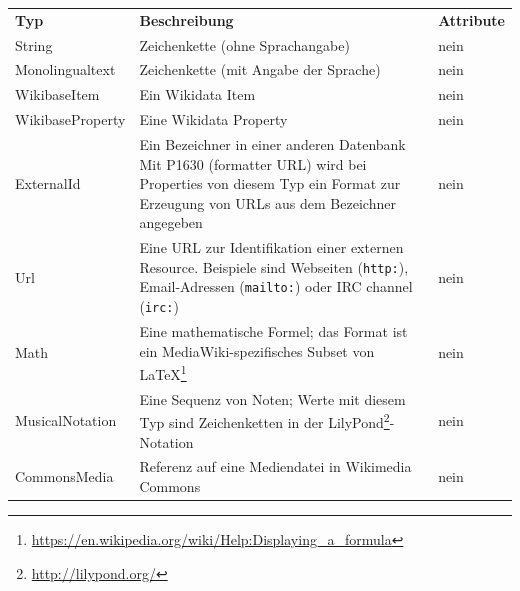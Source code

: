 \begin{table}
  \setlength{\extrarowheight}{0.1cm}
  \begin{adjustwidth}{-1cm}{-1cm}
    \begin{minipage}{\textwidth}
    \begin{tabular}{l p{} p{}}
      \bfseries{Typ}   & \bfseries{Beschreibung}                                                                                                                                       & \bfseries{Attribute} \\
      String           & Zeichenkette (ohne Sprachangabe)                                                                                                                              & nein \\
      Monolingualtext  & Zeichenkette (mit Angabe der Sprache)                                                                                                                         & nein \\
      WikibaseItem     & Ein Wikidata Item                                                                                                                                             & nein \\
      WikibaseProperty & Eine Wikidata Property                                                                                                                                        & nein \\
      ExternalId       & Ein Bezeichner in einer anderen Datenbank\newline{}
                         Mit P1630 (formatter URL) wird bei Properties von diesem Typ ein Format zur Erzeugung von URLs aus dem Bezeichner angegeben                                   & nein \\
      Url              & Eine URL zur Identifikation einer externen Resource. Beispiele sind Webseiten (\verb|http:|), Email-Adressen (\verb|mailto:|) oder IRC channel (\verb|irc:|)  & nein \\
      Math             & Eine mathematische Formel; das Format ist ein MediaWiki-spezifisches Subset von \LaTeX\footnote{\url{https://en.wikipedia.org/wiki/Help:Displaying_a_formula}}& nein \\
      MusicalNotation  & Eine Sequenz von Noten; Werte mit diesem Typ sind Zeichenketten in der LilyPond\footnote{\url{http://lilypond.org/}}-Notation                                 & nein \\
      CommonsMedia     & Referenz auf eine Mediendatei in Wikimedia Commons                                                                                                            & nein \\

\end{tabular}
\end{minipage}
\end{adjustwidth}
\end{table}

